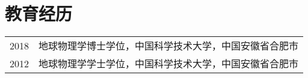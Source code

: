 \section*{教育经历}
\begin{tabular}{p{} p{}}
2018 & 地球物理学博士学位，中国科学技术大学，中国安徽省合肥市 \\
2012 & 地球物理学学士学位，中国科学技术大学，中国安徽省合肥市
\end{tabular}
